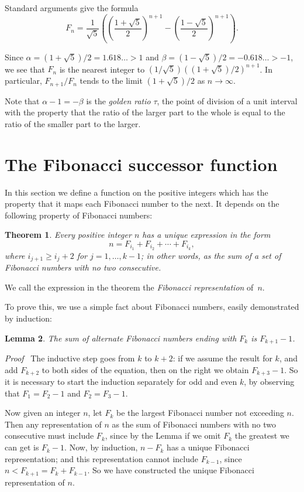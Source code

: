 \documentclass[12pt]{article}
\newtheorem{theorem}{Theorem}[section]
\newtheorem{lemma}[theorem]{Lemma}
\newcommand{\head}[1]{\medbreak\noindent\textit{#1}\ }
\begin{document}
Standard arguments give the formula
\[F_n=\frac{1}{\sqrt{5}}\left(\left(\frac{1+\sqrt{5}}{2}\right)^{n+1}
-\left(\frac{1-\sqrt{5}}{2}\right)^{n+1}\right).\]

Since $\alpha=(1+\sqrt{5})/2=1.618\ldots>1$ and
$\beta=(1-\sqrt{5})/2=-0.618\ldots>-1$, we see that $F_n$ is the nearest
integer to $(1/\sqrt{5})((1+\sqrt{5})/2)^{n+1}$. In particular,
$F_{n+1}/F_n$ tends to the limit $(1+\sqrt{5})/2$ as $n\to\infty$.

Note that $\alpha-1=-\beta$ is the \emph{golden ratio} $\tau$, the point
of division of a unit interval with the property that the ratio of the
larger part to the whole is equal to the ratio of the smaller part to the
larger.

\section{The Fibonacci successor function}
\label{s:fsf}

In this section we define a function on the positive integers
which has the property that it maps each Fibonacci number to
the next. It depends on the following property of Fibonacci
numbers:

\begin{theorem}
Every positive integer $n$ has a unique expression in the form
\[n=F_{i_1}+F_{i_2}+\cdots+F_{i_k},\]
where $i_{j+1}\ge i_j+2$ for $j=1, \ldots, k-1$; in other words,
as the sum of a set of Fibonacci numbers with no two consecutive.
\end{theorem}

We call the expression in the theorem the \emph{Fibonacci
representation} of~$n$.

To prove this, we use a simple fact about Fibonacci numbers,
easily demonstrated by induction:

\begin{lemma}
The sum of alternate Fibonacci numbers ending with $F_k$ is
$F_{k+1}-1$.
\end{lemma}

\head{Proof} The inductive step goes from $k$ to $k+2$: if we
assume the result for $k$, and add $F_{k+2}$ to both sides of
the equation, then on the right we obtain $F_{k+3}-1$. So it is
necessary to start the induction separately for odd and even $k$,
by observing that $F_1=F_2-1$ and $F_2=F_3-1$.

\medbreak

Now given an integer $n$, let $F_k$ be the largest Fibonacci
number not exceeding $n$. Then any representation of $n$ as the
sum of Fibonacci numbers with no two consecutive must include
$F_k$, since by the Lemma if we omit $F_k$ the greatest we can
get is $F_k-1$. Now, by induction, $n-F_k$ has a unique Fibonacci
representation; and this representation cannot include $F_{k-1}$,
since $n<F_{k+1}=F_k+F_{k-1}$. So we have constructed the unique
Fibonacci representation of $n$.
\end{document}

